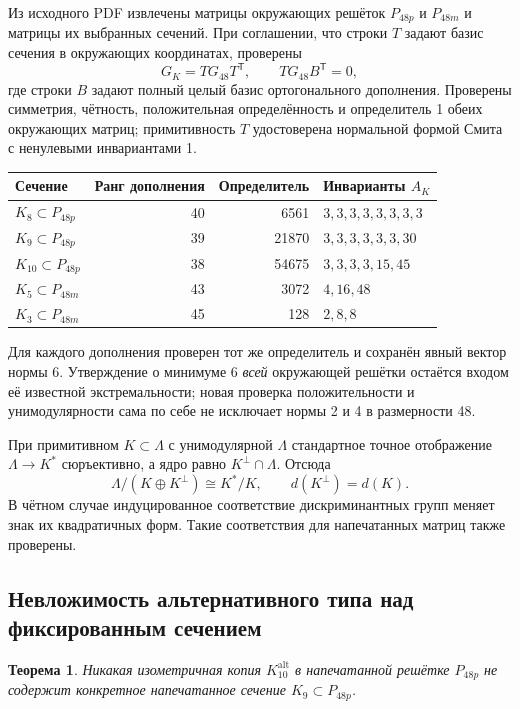 \documentclass[11pt,a4paper]{article}
\newtheorem{theorem}{Теорема}[section]
\theoremstyle{remark}\newtheorem{remark}[theorem]{Замечание}
\newcommand{\Kalt}{K_{10}^{\mathrm{alt}}}
\begin{document}
Из исходного PDF извлечены матрицы окружающих решёток $P_{48p}$ и $P_{48m}$ и матрицы их выбранных сечений. При соглашении, что строки $T$ задают базис сечения в окружающих координатах, проверены
\[
G_K=T G_{48}T^{\mathsf T},\qquad
T G_{48}B^{\mathsf T}=0,
\]
где строки $B$ задают полный целый базис ортогонального дополнения. Проверены симметрия, чётность, положительная определённость и определитель 1 обеих окружающих матриц; примитивность $T$ удостоверена нормальной формой Смита с ненулевыми инвариантами 1.

\begin{center}
\begin{tabular}{lrrl}
\toprule
Сечение &Ранг дополнения&Определитель&Инварианты $A_K$\\\midrule
$K_8\subset P_{48p}$&40&6561&$3,3,3,3,3,3,3,3$\\
$K_9\subset P_{48p}$&39&21870&$3,3,3,3,3,3,30$\\
$K_{10}\subset P_{48p}$&38&54675&$3,3,3,3,15,45$\\
$K_5\subset P_{48m}$&43&3072&$4,16,48$\\
$K_3\subset P_{48m}$&45&128&$2,8,8$\\
\bottomrule
\end{tabular}
\end{center}

Для каждого дополнения проверен тот же определитель и сохранён явный вектор нормы 6. Утверждение о минимуме 6 \emph{всей} окружающей решётки остаётся входом её известной экстремальности; новая проверка положительности и унимодулярности сама по себе не исключает нормы 2 и 4 в размерности 48.

При примитивном $K\subset\Lambda$ с унимодулярной $\Lambda$ стандартное точное отображение $\Lambda\to K^*$ сюръективно, а ядро равно $K^\perp\cap\Lambda$. Отсюда
\[
\Lambda/(K\oplus K^\perp)\cong K^*/K,\qquad
d(K^\perp)=d(K).
\]
В чётном случае индуцированное соответствие дискриминантных групп меняет знак их квадратичных форм. Такие соответствия для напечатанных матриц также проверены.

\subsection{Невложимость альтернативного типа над фиксированным сечением}

\begin{theorem}\label{thm:nonembedding}
Никакая изометричная копия $\Kalt$ в напечатанной решётке $P_{48p}$ не содержит конкретное напечатанное сечение $K_9\subset P_{48p}$.
\end{theorem}
\end{document}
